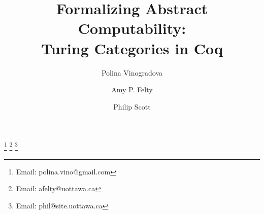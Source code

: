 \documentclass{entcs} \usepackage{entcsmacro}
\begin{document}
	\begin{frontmatter}
\title{Formalizing Abstract Computability:\\ Turing Categories in Coq}
		\author[CS]{Polina Vinogradova}
		\author[CS,Math]{Amy P. Felty}
		\author[Math,CS]{Philip Scott}
		\address[CS]{School of Electrical Engineering and Computer Science, University of Ottawa, Ottawa, Canada}
		\address[Math]{Department of Mathematics and Statistics, University of Ottawa, Ottawa, Canada}
		\thanks[emailpv]{Email: polina.vino@gmail.com}
		\thanks[emailaf]{Email: afelty@uottawa.ca}
		\thanks[emailps]{Email: phil@site.uottawa.ca}



\end{frontmatter}
\end{document}

